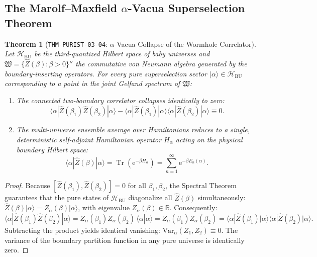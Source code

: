 \documentclass[11pt,a4paper,reqno]{article}
\theoremstyle{plain}
\newtheorem{theorem}{Theorem}[section]
\theoremstyle{definition}
\theoremstyle{remark}
\numberwithin{equation}{section}
\newcommand{\R}{\mathbb{R}}
\newcommand{\Hbu}{\mathcal{H}_{\mathrm{BU}}}
\newcommand{\Zop}{\widehat{Z}}
\providecommand{\Tr}{\operatorname{Tr}}
\begin{document}
\subsection{The Marolf--Maxfield \texorpdfstring{$\alpha$}{alpha}-Vacua Superselection Theorem}
\begin{theorem}[\texttt{THM-PURIST-03-04}: \texorpdfstring{$\alpha$}{alpha}-Vacua Collapse of the Wormhole Correlator]
\label{thm:alpha_factorization_vol3}
Let $\Hbu$ be the third-quantized Hilbert space of baby universes and $\mathfrak{W} = \{\Zop(\beta) : \beta > 0\}''$ the commutative von Neumann algebra generated by the boundary-inserting operators. For every pure superselection sector $|\alpha\rangle \in \Hbu$ corresponding to a point in the joint Gelfand spectrum of $\mathfrak{W}$:
\begin{enumerate}[label=\textbf{(\roman*)}, leftmargin=2.2em]
  \item The connected two-boundary correlator collapses identically to zero:
  \begin{equation}
    \langle \alpha | \Zop(\beta_1) \Zop(\beta_2) | \alpha \rangle - \langle \alpha | \Zop(\beta_1) | \alpha \rangle \langle \alpha | \Zop(\beta_2) | \alpha \rangle \equiv 0.
    \label{eq:var_alpha_zero}
  \end{equation}
  \item The multi-universe ensemble average over Hamiltonians reduces to a single, deterministic self-adjoint Hamiltonian operator $H_\alpha$ acting on the physical boundary Hilbert space:
  \begin{equation}
    \langle \alpha | \Zop(\beta) | \alpha \rangle = \Tr\left( \mathrm{e}^{-\beta H_\alpha} \right) = \sum_{n=1}^\infty \mathrm{e}^{-\beta E_n(\alpha)}.
    \label{eq:single_hamiltonian_trace}
  \end{equation}
\end{enumerate}
\end{theorem}
\begin{proof}
Because $[\Zop(\beta_1), \Zop(\beta_2)] = 0$ for all $\beta_1, \beta_2$, the Spectral Theorem guarantees that the pure states of $\Hbu$ diagonalize all $\Zop(\beta)$ simultaneously: $\Zop(\beta) |\alpha\rangle = Z_\alpha(\beta) |\alpha\rangle$, with eigenvalue $Z_\alpha(\beta) \in \R$. Consequently:
\begin{equation*}
  \langle \alpha | \Zop(\beta_1) \Zop(\beta_2) | \alpha \rangle = Z_\alpha(\beta_1) Z_\alpha(\beta_2) \, \langle \alpha | \alpha \rangle = Z_\alpha(\beta_1) Z_\alpha(\beta_2) = \langle \alpha | \Zop(\beta_1) | \alpha \rangle \langle \alpha | \Zop(\beta_2) | \alpha \rangle.
\end{equation*}
Subtracting the product yields identical vanishing: $\mathrm{Var}_\alpha(Z_1, Z_2) \equiv 0$. The variance of the boundary partition function in any pure universe is identically zero.
\end{proof}
\end{document}
